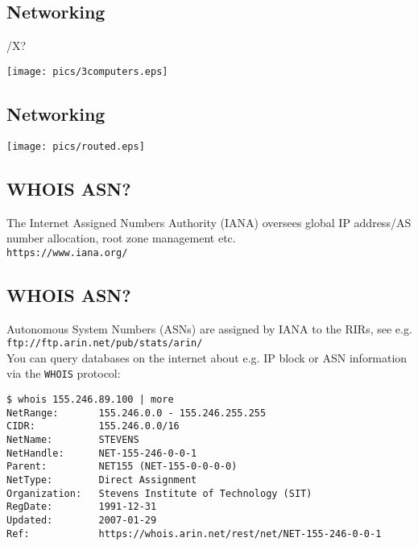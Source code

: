 \documentclass[xga]{xdvislides}
\begin{document}
\subsection{Networking}
/X? %
\vspace*{\fill}
\begin{center}
	\texttt{[image: pics/3computers.eps]} \\
\end{center}
\vspace*{\fill}

\subsection{Networking}
\vspace*{\fill}
\begin{center}
	\texttt{[image: pics/routed.eps]} \\
\end{center}
\vspace*{\fill}

\subsection{WHOIS ASN?}
\Huge
\vfill
\begin{center}
The Internet Assigned Numbers Authority (IANA) oversees global IP
address/AS number allocation, root zone management etc.
\\
\vspace{.5in}
\verb+https://www.iana.org/+
\end{center}
\vfill
\Normalsize

\subsection{WHOIS ASN?}
Autonomous System Numbers (ASNs) are assigned by IANA
to the RIRs, see e.g. {\tt
ftp://ftp.arin.net/pub/stats/arin/}
\\

You can query databases on the internet about e.g. IP
block or ASN information via the {\tt WHOIS} protocol:

\begin{verbatim}
$ whois 155.246.89.100 | more
NetRange:       155.246.0.0 - 155.246.255.255
CIDR:           155.246.0.0/16
NetName:        STEVENS
NetHandle:      NET-155-246-0-0-1
Parent:         NET155 (NET-155-0-0-0-0)
NetType:        Direct Assignment
Organization:   Stevens Institute of Technology (SIT)
RegDate:        1991-12-31
Updated:        2007-01-29
Ref:            https://whois.arin.net/rest/net/NET-155-246-0-0-1
\end{verbatim}
\end{document}
